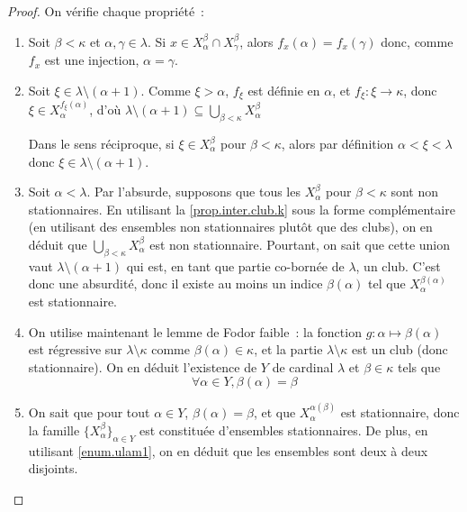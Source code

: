 \begin{proof}
  On vérifie chaque propriété~:
  \begin{enumerate}[label=(\roman*)]
  \item Soit $\beta < \kappa$ et $\alpha, \gamma \in\lambda$. Si
    $x\in X_\alpha^\beta \cap X_\gamma^\beta$, alors $f_x(\alpha) = f_x(\gamma)$
    donc, comme $f_x$ est une injection, $\alpha = \gamma$.
  \item Soit $\xi \in \lambda \setminus (\alpha + 1)$. Comme $\xi > \alpha$,
    $f_\xi$ est définie en $\alpha$, et $f_\xi : \xi \to \kappa$, donc
    $\xi \in X_\alpha^{f_\xi(\alpha)}$, d'où
    $\displaystyle
    \lambda\setminus(\alpha+1)\subseteq\bigcup_{\beta < \kappa} X_\alpha^\beta$

    Dans le sens réciproque, si $\xi \in X_\alpha^\beta$ pour $\beta <\kappa$,
    alors par définition $\alpha < \xi < \lambda$ donc
    $\xi \in \lambda\setminus(\alpha + 1)$.
  \item Soit $\alpha < \lambda$. Par l'absurde, supposons que tous les
    $X_\alpha^\beta$ pour $\beta < \kappa$ sont non stationnaires. En utilisant
    la \cref{prop.inter.club.k} sous la forme complémentaire (en utilisant des
    ensembles non stationnaires plutôt que des clubs), on en déduit que
    $\displaystyle\bigcup_{\beta < \kappa} X_\alpha^\beta$ est non stationnaire.
    Pourtant, on sait que cette union vaut $\lambda \setminus(\alpha + 1)$ qui
    est, en tant que partie co-bornée de $\lambda$, un club. C'est donc une
    absurdité, donc il existe au moins un indice $\beta(\alpha)$ tel que
    $X_\alpha^{\beta(\alpha)}$ est stationnaire.
  \item On utilise maintenant le lemme de Fodor faible~: la fonction
    $g : \alpha \mapsto \beta(\alpha)$ est régressive sur
    $\lambda\setminus\kappa$ comme $\beta(\alpha) \in \kappa$, et la partie
    $\lambda\setminus\kappa$ est un club (donc stationnaire). On en déduit
    l'existence de $Y$ de cardinal $\lambda$ et $\beta \in \kappa$ tels que
    \[\forall \alpha \in Y, \beta(\alpha) = \beta\]
  \item On sait que pour tout $\alpha \in Y$, $\beta(\alpha) = \beta$, et
    que $X_\alpha^{\alpha(\beta)}$ est stationnaire, donc la famille
    $\{X_\alpha^\beta\}_{\alpha \in Y}$ est constituée d'ensembles stationnaires. De
    plus, en utilisant \ref{enum.ulam1}, on en déduit que les ensembles sont
    deux à deux disjoints.
  \end{enumerate}
\end{proof}


